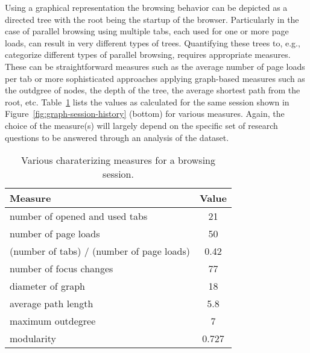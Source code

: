 \documentclass[11pt,fleqn,twoside]{article}
\begin{document}
Using a graphical representation the browsing behavior can be depicted as a directed tree with the root being the startup of the browser. Particularly in the case of parallel browsing using multiple tabs, each used for one or more page loads, can result in very different types of trees. Quantifying these trees to, e.g., categorize different types of parallel browsing, requires appropriate measures. These can be straightforward measures such as the average number of page loads per tab or more sophisticated approaches applying graph-based measures such as the outdgree of nodes, the depth of the tree, the average shortest path from the root, etc. Table~\ref{tab:example-measures} lists the values as calculated for the same session shown in Figure~\ref{fig:graph-session-history} (bottom) for various measures. Again, the choice of the measure(s) will largely depend on the specific set of research questions to be answered through an analysis of the dataset.
\begin{table}
 \centering
 \begin{tabular}[htb]{|l|c|}
  \hline
  \textbf{Measure} & \textbf{Value} \\
  \hline\hline
  number of opened and used tabs & 21 \\
  \hline
  number of page loads & 50 \\
  \hline
  (number of tabs) / (number of page loads) & 0.42 \\
  \hline
  number of focus changes & 77 \\
  \hline\hline
  diameter of graph & 18 \\
  \hline
  average path length & 5.8 \\
  \hline
  maximum outdegree & 7 \\
  \hline
  modularity & 0.727 \\
  \hline
 \end{tabular}
 \caption{Various charaterizing measures for a browsing session.}
 \label{tab:example-measures}
\end{table}
\end{document}
